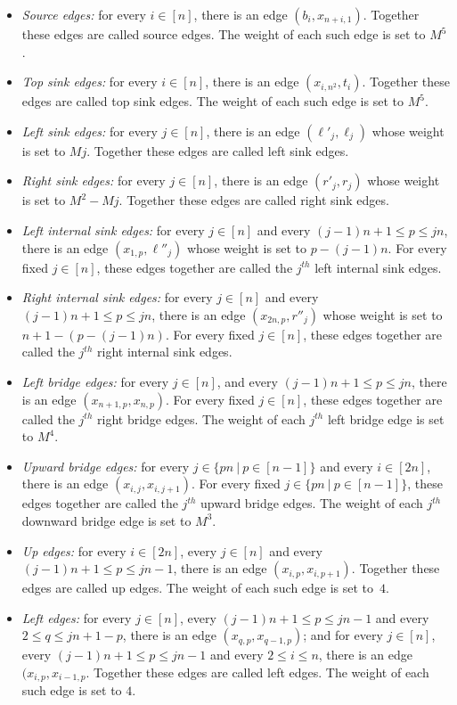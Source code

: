\documentclass[a4paper,11pt]{article}
\theoremstyle{plain}
\newtheorem{identification rule}{Identification Rule}
\theoremstyle{definition}
\theoremstyle{remark}
\begin{document}
\begin{itemize}
\item \emph{Source edges:} for every $i \in [n]$, there is an edge $(b_i,x_{n+i,1})$. Together these edges are called source edges. The weight of each such edge is set to $M^5$.
\item \emph{Top sink edges:} for every $i \in [n]$, there is an edge $(x_{i,n^2},t_i)$. Together these edges are called top sink edges. The weight of each such edge is set to $M^5$.
\item \emph{Left sink edges:} for every $j \in [n]$, there is an edge $(\ell'_j,\ell_j)$ whose weight is set to $Mj$. Together these edges are called left sink edges.
\item  \emph{Right sink edges:} for every $j \in [n]$, there is an edge $(r'_j,r_j)$ whose weight is set to $M^2-Mj$. Together these edges are called right sink edges. 
\item \emph{Left internal sink edges:} for every $j \in [n]$ and every $(j-1)n+1 \leq p \leq jn$, there is an edge $(x_{1,p},\ell''_j)$ whose weight is set to $p-(j-1)n$. For every fixed $j \in [n]$, these edges together are called the $j^{th}$ left internal sink edges.
\item \emph{Right internal sink edges:} for every $j \in [n]$ and every $(j-1)n + 1 \leq p \leq jn$, there is an edge $(x_{2n,p},r''_j)$ whose weight is set to $n+1-(p-(j-1)n)$. For every fixed $j \in [n]$, these edges together are called the $j^{th}$ right internal sink edges.
\item \emph{Left bridge edges:} for every $j \in [n]$, and every $(j-1)n + 1 \leq p \leq jn$, there is an edge $(x_{n+1,p},x_{n,p})$. For every fixed $j \in [n]$, these edges together are called the $j^{th}$ right bridge edges. The weight of each $j^{th}$ left bridge edge is set to $M^4$.
\item \emph{Upward bridge edges:} for every $j \in \{pn~|~p \in [n-1]\}$ and every $i \in [2n]$, there is an edge $(x_{i,j},x_{i,j+1})$. For every fixed $j \in \{pn~|~p \in [n-1]\}$, these edges together are called the $j^{th}$ upward bridge edges. The weight of each $j^{th}$ downward bridge edge is set to $M^3$.
\item \emph{Up edges:} for every $i \in [2n]$, every $j \in [n]$ and every $(j-1)n + 1 \leq p \leq jn-1$, there is an edge $(x_{i,p},x_{i,p+1})$. Together these edges are called up edges. The weight of each such edge is set to~$4$.
\item \emph{Left edges:} for every $j \in [n]$, every $(j-1)n+1 \leq p \leq jn-1$ and every $2 \leq q \leq jn+1-p$, there is an edge $(x_{q,p},x_{q-1,p})$; and for every $j \in [n]$, every $(j-1)n+1 \leq p \leq jn-1$ and every $2 \leq i \leq n$, there is an edge $(x_{i,p},x_{i-1,p}$. Together these edges are called left edges. The weight of each such edge is set to $4$.

\end{itemize}
\end{document}
